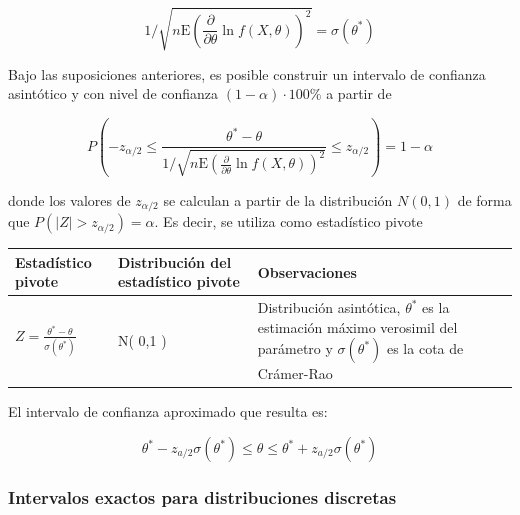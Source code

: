 \documentclass[
]{article}
\begin{document}
\[
1 / \sqrt{n \mathrm{E}\left(\frac{\partial}{\partial \theta} \ln f(X, \theta)\right)^{2}}=\sigma\left(\theta^{*}\right)
\]

Bajo las suposiciones anteriores, es posible construir un intervalo de confianza asintótico y con nivel de confianza \((1-\alpha) \cdot 100 \%\) a partir de

\[
P\left(-z_{\alpha / 2} \leq \frac{\theta^{*}-\theta}{1 / \sqrt{n \mathrm{E}\left(\frac{\partial}{\partial \theta} \ln f(X, \theta)\right)^{2}}} \leq z_{\alpha / 2}\right)=1-\alpha
\]

donde los valores de \(z_{\alpha / 2}\) se calculan a partir de la distribución \(N(0,1)\) de forma que \(P\left(|Z|>z_{\alpha / 2}\right)=\alpha\).
Es decir, se utiliza como estadístico pivote

\begin{longtable}[]{@{}
  >{\centering\arraybackslash}p{}
  >{\centering\arraybackslash}p{}
  >{\centering\arraybackslash}p{}@{}}
\toprule\noalign{}
\begin{minipage}[b]{\linewidth}\centering
Estadístico pivote
\end{minipage} & \begin{minipage}[b]{\linewidth}\centering
Distribución del estadístico pivote
\end{minipage} & \begin{minipage}[b]{\linewidth}\centering
Observaciones
\end{minipage} \\
\midrule\noalign{}
\endhead
\bottomrule\noalign{}
\endlastfoot
\(Z=\frac{\theta^{*}-\theta}{\sigma\left(\theta^{*}\right)}\) & N( 0,1 ) & Distribución asintótica, \(\theta^{*}\) es la estimación máximo verosimil del parámetro y \(\sigma\left(\theta^{*}\right)\) es la cota de Crámer-Rao \\
\end{longtable}

El intervalo de confianza aproximado que resulta es:

\[
\theta^{*}-z_{a / 2} \sigma\left(\theta^{*}\right) \leq \theta \leq \theta^{*}+z_{a / 2} \sigma\left(\theta^{*}\right)
\]

\subsubsection{Intervalos exactos para distribuciones discretas}\label{intervalos-exactos-para-distribuciones-discretas}
\end{document}
